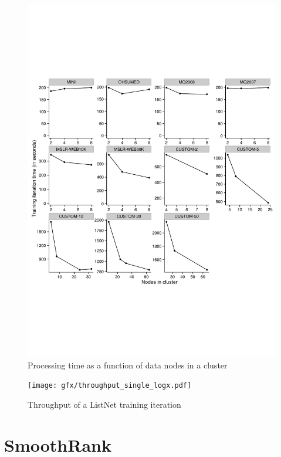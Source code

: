 \begin{figure}
\centering
\includegraphics[trim=0cm 5cm 0cm 5cm, scale=0.7]{gfx/speedup_faceted.pdf}
\caption{Processing time as a function of data nodes in a cluster}
\label{fig:speedup_train_time}
\end{figure}

\begin{figure}
\centering
\texttt{[image: gfx/throughput\_single\_logx.pdf]}
\caption{Throughput of a ListNet training iteration}
\label{fig:listnet_throughput}
\end{figure}

\section{SmoothRank}